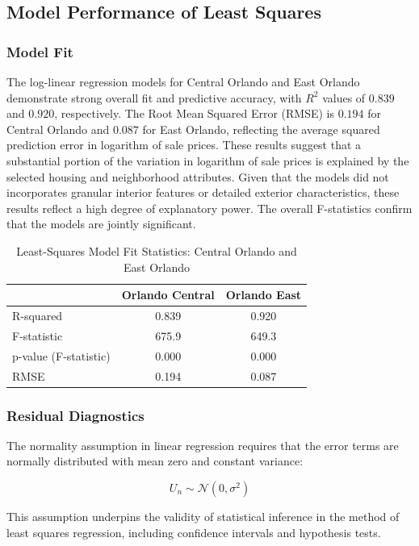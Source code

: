 \subsection*{Model Performance of Least Squares}

\subsubsection*{Model Fit}
The log-linear regression models for Central Orlando and East Orlando demonstrate strong overall fit and predictive accuracy, with $R^2$ values of $0.839$ and $0.920$, respectively. The Root Mean Squared Error (RMSE) is $0.194$ for Central Orlando and $0.087$ for East Orlando, reflecting the average squared prediction error in logarithm of sale prices. These results suggest that a substantial portion of the variation in logarithm of sale prices is explained by the selected housing and neighborhood attributes. Given that the models did not incorporates granular interior features or detailed exterior characteristics, these results reflect a high degree of explanatory power. The overall F-statistics confirm that the models are jointly significant.


\begin{table}[H]
\centering
\caption{Least-Squares Model Fit Statistics: Central Orlando and East Orlando}
\label{tab:model_comparison}
\begin{tabular}{lcc}
\toprule
& \textbf{Orlando Central} & \textbf{Orlando East} \\
\midrule
R-squared           & 0.839  & 0.920 \\
F-statistic                    & 675.9  & 649.3 \\
p-value (F-statistic)          & 0.000  & 0.000 \\
RMSE  & 0.194 & 0.087 \\
\bottomrule
\end{tabular}
\end{table}

\subsubsection*{Residual Diagnostics}

The normality assumption in linear regression requires that the error terms are normally distributed with mean zero and constant variance:

\[
U_n \sim \mathcal{N}(0, \sigma^2)
\]

\noindent This assumption underpins the validity of statistical inference in the method of least squares regression, including confidence intervals and hypothesis tests.


